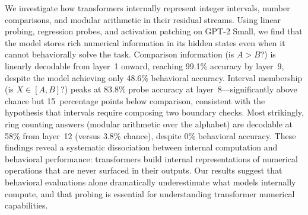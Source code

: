 We investigate how transformers internally represent integer intervals, number comparisons, and modular arithmetic in their residual streams. Using linear probing, regression probes, and activation patching on GPT-2 Small, we find that the model stores rich numerical information in its hidden states even when it cannot behaviorally solve the task. Comparison information (is $A > B$?) is linearly decodable from layer~1 onward, reaching 99.1\% accuracy by layer~9, despite the model achieving only 48.6\% behavioral accuracy. Interval membership (is $X \in [A, B]$?) peaks at 83.8\% probe accuracy at layer~8---significantly above chance but 15~percentage points below comparison, consistent with the hypothesis that intervals require composing two boundary checks. Most strikingly, ring counting answers (modular arithmetic over the alphabet) are decodable at 58\% from layer~12 (versus 3.8\% chance), despite 0\% behavioral accuracy. These findings reveal a systematic dissociation between internal computation and behavioral performance: transformers build internal representations of numerical operations that are never surfaced in their outputs. Our results suggest that behavioral evaluations alone dramatically underestimate what models internally compute, and that probing is essential for understanding transformer numerical capabilities.
